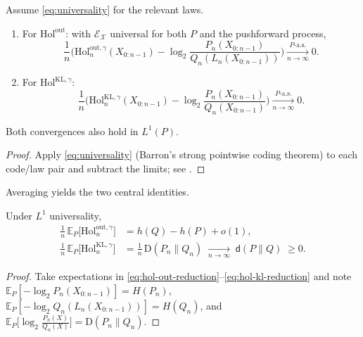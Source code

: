 \documentclass[11pt]{article}
\newcommand{\X}{\mathcal{X}}
\newcommand{\E}{\mathbb{E}}
\newcommand{\1}{\mathbbm{1}}
\newcommand{\KL}{\mathrm{D}}
\newcommand{\code}{\mathcal{E}}
\begin{document}
\begin{lemma}\label{lem:pointwise}
Assume \eqref{eq:universality} for the relevant laws.
\begin{enumerate}[leftmargin=2em,itemsep=0.25em]
\item For $\mathrm{Hol}^{\mathrm{out}}$: with $\code_\X$ universal for both $P$ and the pushforward process,
\begin{equation}\label{eq:hol-out-reduction}
\frac{1}{n}\Big(\mathrm{Hol}_{n}^{\mathrm{out},\gamma}(X_{0:n-1}) - \log_2\frac{P_n(X_{0:n-1})}{Q_n(L_n(X_{0:n-1}))}\Big) \xrightarrow[n\to\infty]{P\text{-a.s.}} 0.
\end{equation}
\item For $\mathrm{Hol}^{\mathrm{KL},\gamma}$:
\begin{equation}\label{eq:hol-kl-reduction}
\frac{1}{n}\Big(\mathrm{Hol}_{n}^{\mathrm{KL},\gamma}(X_{0:n-1}) - \log_2\frac{P_n(X_{0:n-1})}{Q_n(X_{0:n-1})}\Big) \xrightarrow[n\to\infty]{P\text{-a.s.}} 0.
\end{equation}
\end{enumerate}
Both convergences also hold in $L^1(P)$.
\end{lemma}
\begin{proof}
Apply \eqref{eq:universality} (Barron's strong pointwise coding theorem) to each code/law pair and subtract the limits; see \cite{barron1985,csiszarshields2004,shields1996}.
\end{proof}

Averaging yields the two central identities.

\begin{theorem}\label{thm:exp_reductions}
Under $L^1$ universality,
\begin{align}
\frac{1}{n}\,\E_P\big[\mathrm{Hol}_{n}^{\mathrm{out},\gamma}\big]
&= h(Q)-h(P)+o(1), \label{eq:exp-out}\\[0.35em]
\frac{1}{n}\,\E_P\big[\mathrm{Hol}_{n}^{\mathrm{KL},\gamma}\big]
&= \frac{1}{n}\,\KL(P_n\|Q_n)\;\xrightarrow[n\to\infty]{}\; \mathsf{d}(P\|Q)\;\ge 0. \label{eq:exp-kl}
\end{align}
\end{theorem}
\begin{proof}
Take expectations in \eqref{eq:hol-out-reduction}--\eqref{eq:hol-kl-reduction} and note
$\E_P[-\log_2 P_n(X_{0:n-1})]=H(P_n)$, $\E_P[-\log_2 Q_n(L_n(X_{0:n-1}))]=H(Q_n)$, and $\E_P\big[\log_2 \tfrac{P_n(X)}{Q_n(X)}\big]=\KL(P_n\|Q_n)$.
\end{proof}
\end{document}
